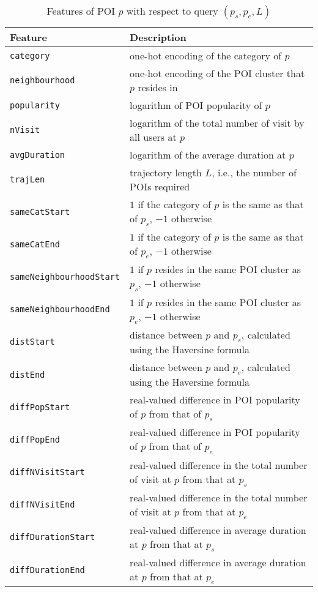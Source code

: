 \documentclass[9pt]{extarticle}
\begin{document}
\begin{table*}[ht]
\caption{Features of POI $p$ with respect to query $(p_s, p_e, L)$}
\label{tab:poifeature}
\centering
\setlength{\tabcolsep}{10pt} %
\begin{tabular}{l|l} \hline
\textbf{Feature}  & \textbf{Description} \\ \hline
\texttt{category}               & one-hot encoding of the category of $p$ \\
\texttt{neighbourhood}          & one-hot encoding of the POI cluster that $p$ resides in \\
\texttt{popularity}             & logarithm of POI popularity of $p$ \\
\texttt{nVisit}                 & logarithm of the total number of visit by all users at $p$ \\
\texttt{avgDuration}            & logarithm of the average duration at $p$ \\ \hline
\texttt{trajLen}                & trajectory length $L$, i.e., the number of POIs required \\
\texttt{sameCatStart}           & $1$ if the category of $p$ is the same as that of $p_s$, $-1$ otherwise \\
\texttt{sameCatEnd}             & $1$ if the category of $p$ is the same as that of $p_e$, $-1$ otherwise \\
\texttt{sameNeighbourhoodStart} & $1$ if $p$ resides in the same POI cluster as $p_s$, $-1$ otherwise \\
\texttt{sameNeighbourhoodEnd}   & $1$ if $p$ resides in the same POI cluster as $p_e$, $-1$ otherwise \\
\texttt{distStart}              & distance between $p$ and $p_s$, calculated using the Haversine formula \\
\texttt{distEnd}                & distance between $p$ and $p_e$, calculated using the Haversine formula \\
\texttt{diffPopStart}           & real-valued difference in POI popularity of $p$ from that of $p_s$ \\
\texttt{diffPopEnd}             & real-valued difference in POI popularity of $p$ from that of $p_e$ \\
\texttt{diffNVisitStart}        & real-valued difference in the total number of visit at $p$ from that at $p_s$ \\
\texttt{diffNVisitEnd}          & real-valued difference in the total number of visit at $p$ from that at $p_e$ \\
\texttt{diffDurationStart}      & real-valued difference in average duration at $p$ from that at $p_s$ \\
\texttt{diffDurationEnd}        & real-valued difference in average duration at $p$ from that at $p_e$ \\ \hline
\end{tabular}
\end{table*}
\end{document}
